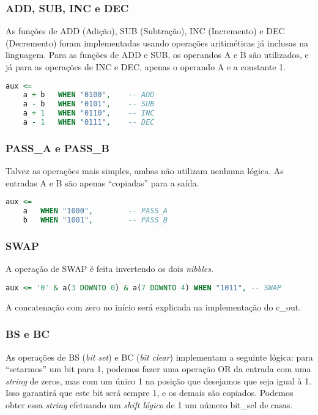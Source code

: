 \documentclass{article}
\begin{document}
\subsubsection{ADD, SUB, INC e DEC}

As funções de ADD (Adição), SUB (Subtração), INC (Incremento) e DEC (Decremento) foram implementadas usando operações aritiméticas já inclusas na linguagem. Para as funções de ADD e SUB, os operandos A e B são utilizados, e já para as operações de INC e DEC, apenas o operando A e a constante 1.

\begin{lstlisting}[language=VHDL]
aux <=  
    a + b   WHEN "0100",    -- ADD
    a - b   WHEN "0101",    -- SUB
    a + 1   WHEN "0110",    -- INC
    a - 1   WHEN "0111",    -- DEC
\end{lstlisting}

\subsubsection{PASS\_A e PASS\_B}

Talvez as operações mais simples, ambas não utilizam nenhuma lógica. As entradas A e B são apenas ``copiadas'' para a saída.

\begin{lstlisting}[language=VHDL]
aux <=  
    a   WHEN "1000",        -- PASS_A
    b   WHEN "1001",        -- PASS_B
\end{lstlisting}

\subsubsection{SWAP}

A operação de SWAP é feita invertendo os dois \textit{nibbles}.

\begin{lstlisting}[language=VHDL]
aux <= '0' & a(3 DOWNTO 0) & a(7 DOWNTO 4) WHEN "1011", -- SWAP
\end{lstlisting}

A concatenação com zero no início será explicada na implementação do c\_out.

\subsubsection{BS e BC}

As operações de BS (\textit{bit set}) e BC (\textit{bit clear}) implementam a seguinte lógica: para ``setarmos'' um bit para 1, podemos fazer uma operação OR da entrada com uma \textit{string} de zeros, mas com um único 1 na posição que desejamos que seja igual à 1. Isso garantirá que este bit será sempre 1, e os demais são copiados. Podemos obter essa \textit{string} efetuando um \textit{shift lógico} de 1 um número bit\_sel de casas.
\end{document}
